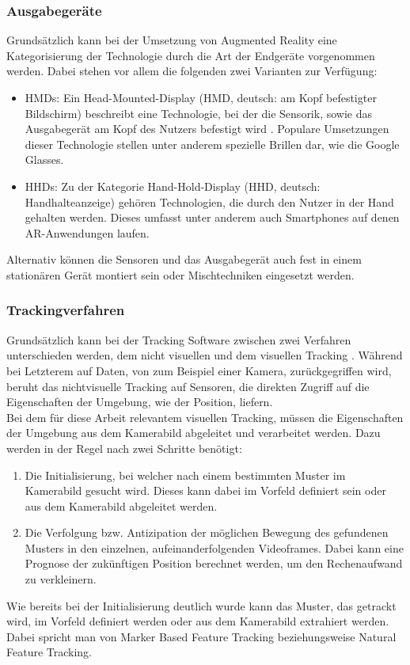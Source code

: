 \subsubsection{Ausgabegeräte}\label{sec:ausgabegeräte}
Grundsätzlich kann bei der Umsetzung von Augmented Reality eine Kategorisierung der Technologie durch die Art der Endgeräte vorgenommen werden. Dabei stehen vor allem die folgenden zwei Varianten zur Verfügung:
\begin{itemize}
\item HMDs: Ein Head-Mounted-Display (HMD, deutsch: \glqq am Kopf befestigter Bildschirm\grqq) beschreibt eine Technologie, bei der die Sensorik, sowie das Ausgabegerät am Kopf des Nutzers befestigt wird \citep[S. 44]{mehler-bicher:augmented-reality}. Populare Umsetzungen dieser Technologie stellen unter anderem spezielle Brillen dar, wie die Google Glasses.
\item HHDs: Zu der Kategorie Hand-Hold-Display (HHD, deutsch: \glqq Handhalteanzeige\grqq) gehören Technologien, die durch den Nutzer in der Hand gehalten werden. Dieses umfasst unter anderem auch Smartphones auf denen AR-Anwendungen laufen.
\end{itemize}
Alternativ können die Sensoren und das Ausgabegerät auch fest in einem stationären Gerät montiert sein \citep[S. 27]{mehler-bicher:augmented-reality} oder Mischtechniken eingesetzt werden.

\subsubsection{Trackingverfahren}\label{sec:Trackingverfahren}
Grundsätzlich kann bei der Tracking Software zwischen zwei Verfahren unterschieden werden, dem nicht visuellen und dem visuellen Tracking \citep[S. 26]{mehler-bicher:augmented-reality}. Während bei Letzterem auf Daten, von zum Beispiel einer Kamera, zurückgegriffen wird, beruht das nichtvisuelle Tracking auf Sensoren, die direkten Zugriff auf die Eigenschaften der Umgebung, wie der Position, liefern. \\
Bei dem für diese Arbeit relevantem visuellen Tracking, müssen die Eigenschaften der Umgebung aus dem Kamerabild abgeleitet und verarbeitet werden. Dazu werden in der Regel nach \citet[S. 26]{mehler-bicher:augmented-reality} zwei Schritte benötigt:
\begin{enumerate}
\item Die Initialisierung, bei welcher nach einem bestimmten Muster im Kamerabild gesucht wird. Dieses kann dabei im Vorfeld definiert sein oder aus dem Kamerabild abgeleitet werden.
\item Die Verfolgung bzw. Antizipation der möglichen Bewegung des gefundenen Musters in den einzelnen, aufeinanderfolgenden Videoframes. Dabei kann eine Prognose der zukünftigen Position berechnet werden, um den Rechenaufwand zu verkleinern.
\end{enumerate}
Wie bereits bei der Initialisierung deutlich wurde kann das Muster, das getrackt wird, im Vorfeld definiert werden oder aus dem Kamerabild extrahiert werden. Dabei spricht man von Marker Based Feature Tracking beziehungsweise Natural Feature Tracking. 

